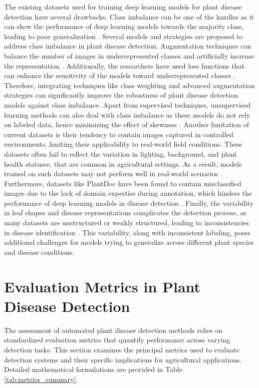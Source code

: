 \documentclass[sn-mathphys]{sn-jnl}
\theoremstyle{thmstyleone}%
\theoremstyle{thmstyletwo}%
\theoremstyle{thmstylethree}%
\begin{document}
\par The existing datasets used for training deep learning models for plant disease detection have several drawbacks. Class imbalance can be one of the hurdles as it can skew the performance of deep learning models towards the majority class, leading to poor generalization \citep{ahmad2021plant}. Several models and strategies are proposed to address class imbalance in plant disease detection. Augmentation techniques can balance the number of images in underrepresented classes and artificially increase the representation \citep{alruwaili2019efficient}. Additionally, the researchers have used loss functions that can enhance the sensitivity of the models toward underrepresented classes \citep{zhong2020research}. Therefore, integrating techniques like class weighting and advanced augmentation strategies can significantly improve the robustness of plant disease detection models against class imbalance. Apart from supervised techniques, unsupervised learning methods can also deal with class imbalance as these models do not rely on labeled data, hence minimizing the effect of skewness \citep{nazki2020unsupervised}. 
Another limitation of current datasets is their tendency to contain images captured in controlled environments, limiting their applicability to real-world field conditions. These datasets often fail to reflect the variation in lighting, background, and plant health statuses, that are common in agricultural settings. As a result, models trained on such datasets may not perform well in real-world scenarios \citep{gong2023analysis}. Furthermore, datasets like PlantDoc have been found to contain misclassified images due to the lack of domain expertise during annotation, which hinders the performance of deep learning models in disease detection \citep{moupojou2023fieldplant}. Finally, the variability in leaf shapes and disease representations complicates the detection process, as many datasets are unstructured or weakly structured, leading to inconsistencies in disease identification \citep{kim2022instance}. This variability, along with inconsistent labeling, poses additional challenges for models trying to generalize across different plant species and disease conditions.


\section{Evaluation Metrics in Plant Disease Detection} \label{sec:em}

The assessment of automated plant disease detection methods relies on standardized evaluation metrics that quantify performance across varying detection tasks. This section examines the principal metrics used to evaluate detection systems and their specific implications for agricultural applications. Detailed mathematical formulations are provided in Table \ref{tab:metrics_summary}.
\end{document}
